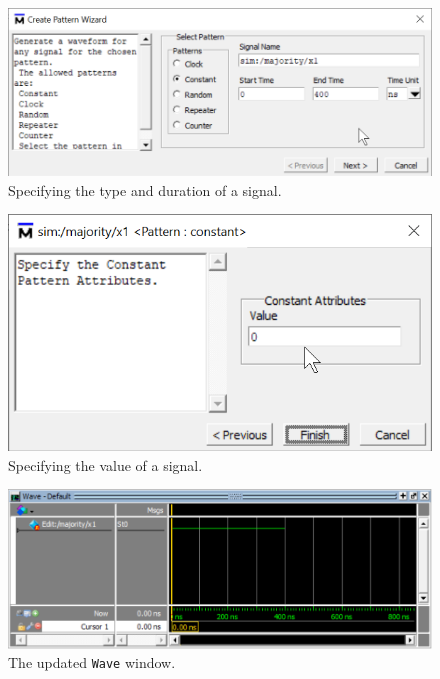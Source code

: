 \documentclass[11pt, twoside, pdftex]{article}
\begin{document}
\begin{figure}[H]
   \begin{center}
      \includegraphics[scale=1.0]{figures/figure11.png}
   \caption{Specifying the type and duration of a signal.} 
	 \label{fig:11}
	 \end{center}
\end{figure}

\begin{figure}[H]
   \begin{center}
      \includegraphics[scale=1.0]{figures/figure12.png}
   \caption{Specifying the value of a signal.} 
	 \label{fig:12}
	 \end{center}
\end{figure}

\begin{figure}[H]
   \begin{center}
      \includegraphics[scale=1.0]{figures/figure13.png}
       \caption{The updated \texttt{Wave} window.} 
	 \label{fig:13}
	 \end{center}
\end{figure}
\end{document}
